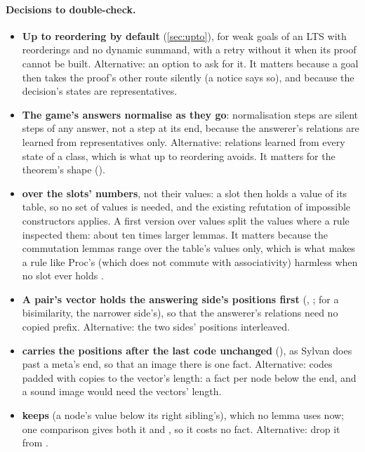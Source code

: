 \paragraph{Decisions to double-check.}
\begin{itemize}
\item \textbf{Up to reordering by default} (\cref{sec:upto}), for weak
  goals of an LTS with reorderings and no dynamic summand, with a retry
  without it when its proof cannot be built. Alternative: an option to
  ask for it. It matters because a goal then takes the proof's other
  route silently (a notice says so), and because the decision's states
  are representatives.
\item \textbf{The game's answers normalise as they go}: normalisation
  steps are silent steps of any answer, not a step at its end, because
  the answerer's relations are learned from representatives only.
  Alternative: relations learned from every state of a class, which is
  what up to reordering avoids. It matters for the theorem's shape
  ().
\item \textbf{ over the slots' numbers}, not their values: a
  slot then holds a value of its table, so no set of values is needed,
  and the existing refutation of impossible constructors applies. A first
  version over values split the values where a rule inspected them:
  about ten times larger lemmas. It matters because the commutation
  lemmas range over the table's values only, which is what makes a rule
  like Proc's  (which does not commute with
  associativity) harmless when no slot ever holds .
\item \textbf{A pair's vector holds the answering side's positions first}
  (, ; for a bisimilarity, the
  narrower side's), so that the answerer's relations need no copied
  prefix. Alternative: the two sides' positions interleaved.
\item \textbf{ carries the positions after the last code
  unchanged} (), as Sylvan does past a meta's end,
  so that an image there is one fact. Alternative: codes padded with
  copies to the vector's length: a fact per node below the end, and a
  sound image would need the vectors' length.
\item \textbf{ keeps } (a node's value below its right
  sibling's), which no lemma uses now; one comparison gives both it and
  , so it costs no fact. Alternative: drop it from .

\end{itemize}
